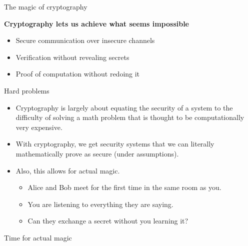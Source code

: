 \documentclass[aspectratio=169, lualatex, handout]{beamer}
\begin{document}
\begin{frame}[c]{The magic of cryptography}
	\begin{center}
		\Large\textbf{Cryptography lets us achieve what seems impossible}
		\vspace{1cm}
		\begin{itemize}[<+->]
			\item Secure communication over insecure channels
			\item Verification without revealing secrets
			\item Proof of computation without redoing it
		\end{itemize}
	\end{center}
\end{frame}

\begin{frame}{Hard problems}
	\begin{itemize}[<+->]
		\item Cryptography is largely about equating the security of a system to the
		      difficulty of solving a math problem that is thought to be computationally
		      very expensive.
		\item With cryptography, we get security systems that we can literally
		      mathematically prove as secure (under assumptions).
		\item Also, this allows for actual magic.
		      \begin{itemize}[<+->]
			      \item Alice and Bob meet for the first time in the same room as you.
			      \item You are listening to everything they are saying.
			      \item Can they exchange a secret without you learning it?
		      \end{itemize}
	\end{itemize}
\end{frame}

\begin{frame}{Time for actual magic}
\end{frame}
\end{document}
